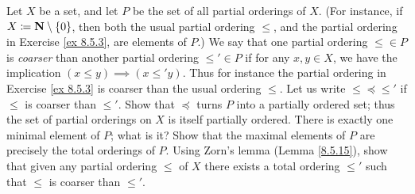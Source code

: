 \begin{exercise}\label{ex 8.5.16}
    Let \(X\) be a set, and let \(P\) be the set of all partial orderings of \(X\).
    (For instance, if \(X \coloneqq \mathbf{N} \setminus \{0\}\), then both the usual partial ordering \(\leq\), and the partial ordering in Exercise \ref{ex 8.5.3}, are elements of \(P\).)
    We say that one partial ordering \(\leq \in P\) is \emph{coarser} than another partial ordering \(\leq' \in P\) if for any \(x, y \in X\), we have the implication \((x \leq y) \implies (x \leq' y)\).
    Thus for instance the partial ordering in Exercise \ref{ex 8.5.3} is coarser than the usual ordering \(\leq\).
    Let us write \(\leq \preceq \leq'\) if \(\leq\) is coarser than \(\leq'\).
    Show that \(\preceq\) turns \(P\) into a partially ordered set;
    thus the set of partial orderings on \(X\) is itself partially ordered.
    There is exactly one minimal element of \(P\);
    what is it?
    Show that the maximal elements of \(P\) are precisely the total orderings of \(P\).
    Using Zorn's lemma (Lemma \ref{8.5.15}), show that given any partial ordering \(\leq\) of \(X\) there exists a total ordering \(\leq'\) such that \(\leq\) is coarser than \(\leq'\).
\end{exercise}

